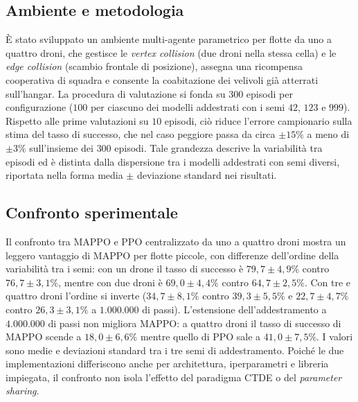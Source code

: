 \documentclass[12pt,a4paper,twoside]{report}
\begin{document}
\subsection{Ambiente e metodologia}
È stato sviluppato un ambiente multi-agente parametrico per flotte da uno a quattro droni, che gestisce le \emph{vertex collision} (due droni nella stessa cella) e le \emph{edge collision} (scambio frontale di posizione), assegna una ricompensa cooperativa di squadra e consente la coabitazione dei velivoli già atterrati sull'hangar. La procedura di valutazione si fonda su $300$ episodi per configurazione ($100$ per ciascuno dei modelli addestrati con i semi $42$, $123$ e $999$). Rispetto alle prime valutazioni su $10$ episodi, ciò riduce l'errore campionario sulla stima del tasso di successo, che nel caso peggiore passa da circa $\pm 15\%$ a meno di $\pm 3\%$ sull'insieme dei $300$ episodi. Tale grandezza descrive la variabilità tra episodi ed è distinta dalla dispersione tra i modelli addestrati con semi diversi, riportata nella forma media $\pm$ deviazione standard nei risultati.

\subsection{Confronto sperimentale}
Il confronto tra MAPPO e PPO centralizzato da uno a quattro droni mostra un leggero vantaggio di MAPPO per flotte piccole, con differenze dell'ordine della variabilità tra i semi: con un drone il tasso di successo è $79,7 \pm 4,9\%$ contro $76,7 \pm 3,1\%$, mentre con due droni è $69,0 \pm 4,4\%$ contro $64,7 \pm 2,5\%$. Con tre e quattro droni l'ordine si inverte ($34,7 \pm 8,1\%$ contro $39,3 \pm 5,5\%$ e $22,7 \pm 4,7\%$ contro $26,3 \pm 3,1\%$ a $1.000.000$ di passi). L'estensione dell'addestramento a $4.000.000$ di passi non migliora MAPPO: a quattro droni il tasso di successo di MAPPO scende a $18,0 \pm 6,6\%$ mentre quello di PPO sale a $41,0 \pm 7,5\%$. I valori sono medie e deviazioni standard tra i tre semi di addestramento. Poiché le due implementazioni differiscono anche per architettura, iperparametri e libreria impiegata, il confronto non isola l'effetto del paradigma CTDE o del \emph{parameter sharing}.
\end{document}
